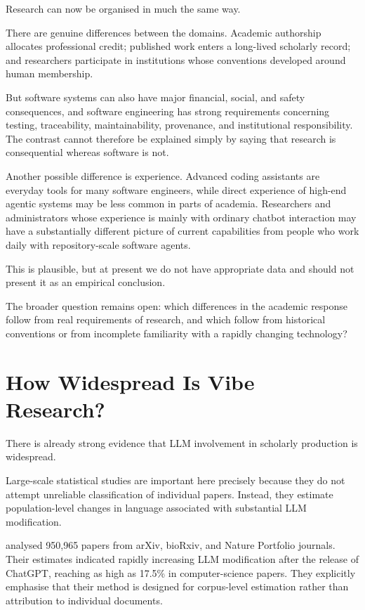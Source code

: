 Research can now be organised in much the same way.

There are genuine differences between the domains. Academic authorship allocates professional credit; published work enters a long-lived scholarly record; and researchers participate in institutions whose conventions developed around human membership.

But software systems can also have major financial, social, and safety consequences, and software engineering has strong requirements concerning testing, traceability, maintainability, provenance, and institutional responsibility. The contrast cannot therefore be explained simply by saying that research is consequential whereas software is not.

Another possible difference is experience. Advanced coding assistants are everyday tools for many software engineers, while direct experience of high-end agentic systems may be less common in parts of academia. Researchers and administrators whose experience is mainly with ordinary chatbot interaction may have a substantially different picture of current capabilities from people who work daily with repository-scale software agents.

This is plausible, but at present we do not have appropriate data and should not present it as an empirical conclusion.

The broader question remains open: which differences in the academic response follow from real requirements of research, and which follow from historical conventions or from incomplete familiarity with a rapidly changing technology?


\section{How Widespread Is Vibe Research?}

There is already strong evidence that LLM involvement in scholarly production is widespread.

Large-scale statistical studies are important here precisely because they do not attempt unreliable classification of individual papers. Instead, they estimate population-level changes in language associated with substantial LLM modification.

\citet{liangEtAl2024mapping} analysed 950,965 papers from arXiv, bioRxiv, and Nature Portfolio journals. Their estimates indicated rapidly increasing LLM modification after the release of ChatGPT, reaching as high as 17.5\% in computer-science papers. They explicitly emphasise that their method is designed for corpus-level estimation rather than attribution to individual documents.

